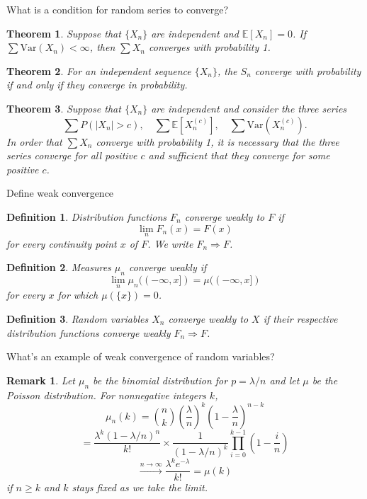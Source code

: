 \documentclass[avery5388,grid,frame]{flashcards}
\newcommand{\E}{\mathbb{E}}
\newcommand{\Var}{\text{Var}}
\newtheorem*{theorem}{Theorem}
\newtheorem*{definition}{Definition}
\newtheorem*{remark}{Remark}
\begin{document}
\begin{flashcard}
    {What is a condition for random series to converge?}
    \begin{theorem}
        Suppose that $\{ X_n \}$ are independent and $\E[X_n] = 0$. If $\sum \Var(X_n) < \infty$, then $\sum X_n$ converges with probability 1.
    \end{theorem}

    \begin{theorem}
        For an independent sequence $\{ X_n \}$, the $S_n$ converge with probability if and only if they converge in probability.
    \end{theorem}

    \begin{theorem}
        Suppose that $\{ X_n \}$ are independent and consider the three series
        $$\sum P(|X_n| > c), \quad \sum \E[X_n^{(c)}], \quad \sum \Var(X_n^{(c)}).$$
        In order that $\sum X_n$ converge with probability 1, it is necessary that the three series converge for all positive $c$ and sufficient that they converge for some positive $c$.
    \end{theorem}
\end{flashcard}


\begin{flashcard}
    {Define weak convergence}
    \begin{definition}
        Distribution functions $F_n$ converge weakly to $F$ if
        $$\lim_n F_n(x) = F(x)$$
        for every continuity point $x$ of $F$. We write $F_n \Rightarrow F$.
    \end{definition}

    \begin{definition}
        Measures $\mu_n$ converge weakly if
        $$\lim_n \mu_n((-\infty,x]) = \mu((-\infty,x])$$
        for every $x$ for which $\mu(\{ x \}) = 0$.
    \end{definition}

    \begin{definition}
        Random variables $X_n$ converge weakly to $X$ if their respective distribution functions converge weakly $F_n \Rightarrow F$.
    \end{definition}
\end{flashcard}


\begin{flashcard}
    {What's an example of weak convergence of random variables?}
    \begin{remark}
        Let $\mu_n$ be the binomial distribution for $p = \lambda / n$ and let $\mu$ be the Poisson distribution. For nonnegative integers $k$,
        $$\mu_n(k) = \binom{n}{k} \left ( \frac \lambda n \right )^k \left ( 1 - \frac \lambda n \right)^{n-k}$$
        $$= \frac{\lambda^k (1 - \lambda/n)^n}{k!} \times \frac{1}{(1-\lambda/n)^k} \prod_{i=0}^{k-1}(1 - \frac i n)$$
        $$\overset{{n \rightarrow \infty}}{\rightarrow} \frac{\lambda^k e^{-\lambda}}{k!} = \mu(k)$$
        if $n \geq k$ and $k$ stays fixed as we take the limit.
    \end{remark}
\end{flashcard}
\end{document}
